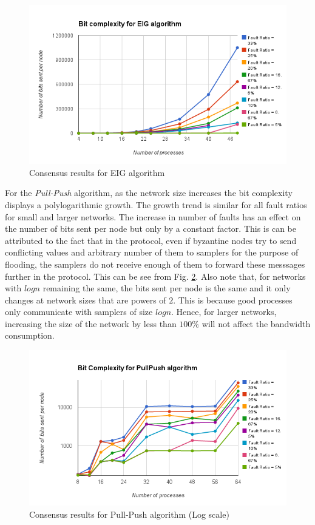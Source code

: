 \begin{figure}[h]
 \centering
\includegraphics[scale=0.4]{eignolog}
\caption{Consensus results for EIG algorithm}
 \label{fig:eignolog}
\end{figure}
For the \textit{Pull-Push} algorithm, as the network size increases the bit complexity displays a polylogarithmic growth. The growth trend is similar for all fault ratios for small and larger networks. The increase in number of faults has an effect on the number of bits sent per node but only by a constant factor. This is can be attributed to the fact that in the protocol, even if byzantine nodes try to send conflicting values and arbitrary number of them to samplers for the purpose of flooding, the samplers do not receive enough of them to forward these messsages further in the protocol. This can be see from Fig. \ref{fig:pull_push}. Also note that, for networks with $logn$ remaining the same, the bits sent per node is the same and it only changes at network sizes that are powers of $2$. This is because good processes only communicate with samplers of size $logn$. Hence, for larger networks, increasing the size of the network by less than $100\%$ will not affect the bandwidth consumption.
\begin{figure}[h]
 \centering
\includegraphics[scale=0.4]{pull_push}
\caption{Consensus results for Pull-Push algorithm (Log scale)}
 \label{fig:pull_push}
\end{figure}

